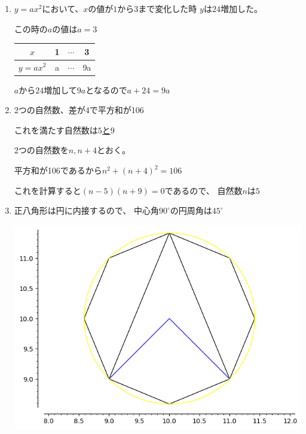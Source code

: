 \documentclass[12pt,b5paper]{ltjsarticle}
\begin{document}
\begin{enumerate}\renewcommand{\theenumi}{(\arabic{enumi})}
 \item
      $y=ax^2$において、$x$の値が$1$から$3$まで変化した時
      $y$は$24$増加した。

      この時の$a$の値は\underline{$a=3$}


      \begin{tabular}{|c|c|c|c|}
       \hline
       $x$ & 1 & $\cdots$ & 3\\ \hline
       $y=ax^2$ & a & $\cdots$ & 9a\\ \hline
      \end{tabular}

      $a$から$24$増加して$9a$となるので$a+24=9a$

 \item 2つの自然数、差が4で平方和が106

       これを満たす自然数は\underline{$5$と$9$}


       2つの自然数を$n, n+4$とおく。

       平方和が106であるから$n^2+(n+4)^2=106$

       これを計算すると$(n-5)(n+9)=0$であるので、
       自然数$n$は$5$

 \item
      正八角形は円に内接するので、
      中心角$90^\circ$の円周角は\underline{$45^\circ$}

\includegraphics[scale=0.4]{octagon.png}

\end{enumerate}


%
%
\end{document}
